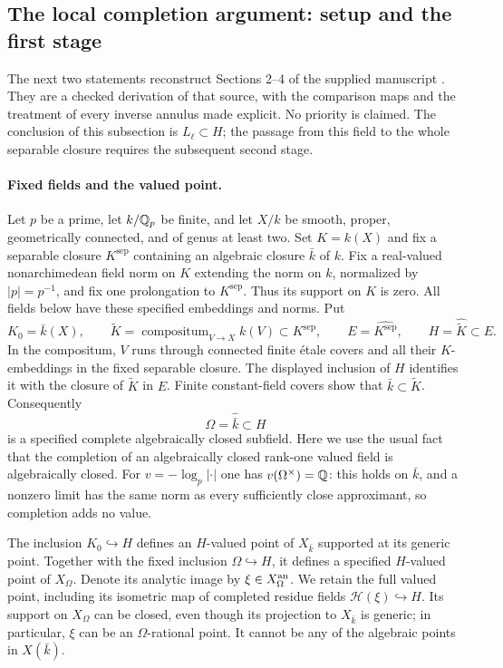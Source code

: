 \subsection{The local completion argument: setup and the first stage}
\label{sec:D-local-first-stage}

The next two statements reconstruct Sections 2--4 of the supplied
manuscript \citet{D_OpenAI2026}. They are a checked derivation of that
source, with the comparison maps and the treatment of every inverse
annulus made explicit. No priority is claimed. The conclusion of this
subsection is $L_\ell\subset H$; the passage from this field to the
whole separable closure requires the subsequent second stage.

\paragraph{Fixed fields and the valued point.}
Let $p$ be a prime, let $k/\mathbb Q_p$ be finite, and let $X/k$ be smooth,
proper, geometrically connected, and of genus at least two. Set
$K=k(X)$ and fix a separable closure $K^{\mathrm{sep}}$ containing an
algebraic closure $\bar k$ of $k$. Fix a real-valued nonarchimedean
field norm on $K$ extending the norm on $k$, normalized by
$|p|=p^{-1}$, and fix one prolongation to $K^{\mathrm{sep}}$.
Thus its support on $K$ is zero. All fields below have these specified
embeddings and norms. Put
\[
 K_0=\bar k(X),\qquad
 \widetilde K=\operatorname{compositum}_{V\to X}
                    k(V)\subset K^{\mathrm{sep}},
 \qquad E=\widehat{K^{\mathrm{sep}}},\qquad
 H=\widehat{\widetilde K}\subset E.
\]
In the compositum, $V$ runs through connected finite \'etale covers and all their
$K$-embeddings in the fixed separable closure. The displayed inclusion
of $H$ identifies it with the closure of $\widetilde K$ in $E$.
Finite constant-field covers show that $\bar k\subset\widetilde K$.
Consequently
\[
                     \Omega=\widehat{\bar k}\subset H
\]
is a specified complete algebraically closed subfield. Here we use
the usual fact that the completion of an algebraically closed
rank-one valued field is algebraically closed. For
$v=-\log_p|\cdot|$ one has $v(\Omega^\times)=\mathbb Q$: this holds on
$\bar k$, and a nonzero limit has the same norm as every sufficiently
close approximant, so completion adds no value.

The inclusion $K_0\hookrightarrow H$ defines an $H$-valued point of
$X_{\bar k}$ supported at its generic point. Together with the fixed
inclusion $\Omega\hookrightarrow H$, it defines a specified
$H$-valued point of $X_\Omega$. Denote its analytic image by
$\xi\in X_\Omega^{\rm an}$. We retain the full valued point,
including its isometric map of completed residue fields
$\mathcal H(\xi)\hookrightarrow H$. Its support on $X_\Omega$ can
be closed, even though its projection to $X_{\bar k}$ is generic;
in particular, $\xi$ can be an $\Omega$-rational point. It cannot
be any of the algebraic points in $X(\bar k)$.

